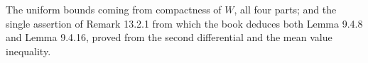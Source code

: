 \begin{lemma}
  \label{lem:13.2.3}
  \leanok
  The uniform bounds coming from compactness of $W$, all four parts; and the
  single assertion of Remark 13.2.1 from which the book deduces both Lemma 9.4.8
  and Lemma 9.4.16, proved from the second differential and the mean value
  inequality.
\end{lemma}
